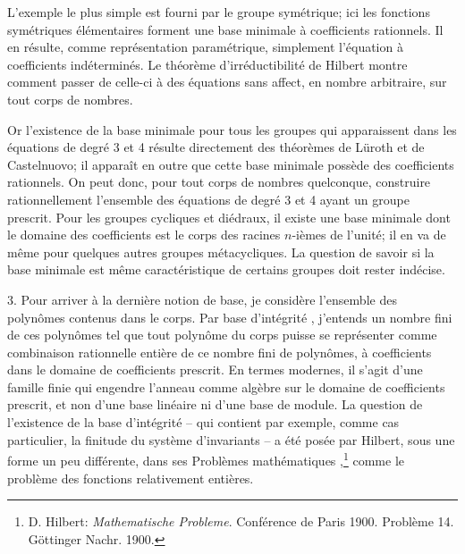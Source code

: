 \documentclass[11pt]{article}
\begin{document}
L'exemple le plus simple est fourni par le groupe symétrique; ici les fonctions symétriques élémentaires forment une base minimale à coefficients rationnels. Il en résulte, comme représentation paramétrique, simplement l'équation à coefficients indéterminés. Le théorème d'irréductibilité de Hilbert montre comment passer de celle-ci à des équations sans affect, en nombre arbitraire, sur tout corps de nombres.

Or l'existence de la base minimale pour tous les groupes qui apparaissent dans les équations de degré 3 et 4 résulte directement des théorèmes de Lüroth et de Castelnuovo; il apparaît en outre que cette base minimale possède des coefficients rationnels. On peut donc, pour tout corps de nombres quelconque, construire rationnellement l'ensemble des équations de degré 3 et 4 ayant un groupe prescrit. Pour les groupes cycliques et diédraux, il existe une base minimale dont le domaine des coefficients est le corps des racines $n$-ièmes de l'unité; il en va de même pour quelques autres groupes métacycliques. La question de savoir si la base minimale est même caractéristique de certains groupes doit rester indécise.

3. Pour arriver à la dernière notion de base, je considère l'ensemble des polynômes contenus dans le corps. Par \og base d'intégrité \fg{}, j'entends un nombre fini de ces polynômes tel que tout polynôme du corps puisse se représenter comme combinaison rationnelle entière de ce nombre fini de polynômes, à coefficients dans le domaine de coefficients prescrit. En termes modernes, il s'agit d'une famille finie qui engendre l'anneau comme algèbre sur le domaine de coefficients prescrit, et non d'une base linéaire ni d'une base de module. La question de l'existence de la base d'intégrité -- qui contient par exemple, comme cas particulier, la finitude du système d'invariants -- a été posée par Hilbert, sous une forme un peu différente, dans ses \og Problèmes mathématiques \fg{},\footnote{D. Hilbert: \emph{Mathematische Probleme}. Conférence de Paris 1900. Problème 14. Göttinger Nachr. 1900.} comme le problème des fonctions relativement entières.
\end{document}
